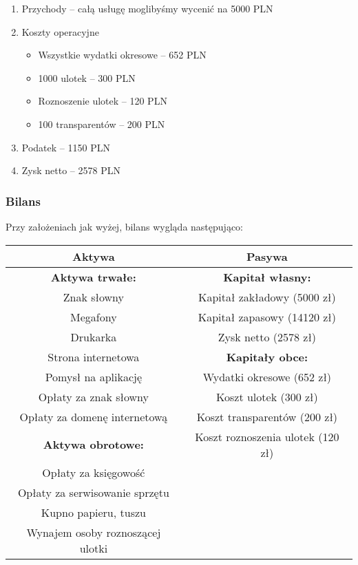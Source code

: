 \documentclass{article}
\begin{document}
\begin{enumerate}
\item Przychody -- całą usługę moglibyśmy wycenić na 5000 PLN
\item Koszty operacyjne
\begin{itemize}
\item Wszystkie wydatki okresowe -- 652 PLN
\item 1000 ulotek -- 300 PLN
\item Roznoszenie ulotek -- 120 PLN
\item 100 transparentów -- 200 PLN
\end{itemize}
\item Podatek -- 1150 PLN
\item Zysk netto -- 2578 PLN
\end{enumerate}

\subsubsection{Bilans}
Przy założeniach jak wyżej, bilans wygląda następująco:
\begin{table}[!ht]
\label{tableb}
\vspace{0.3cm}
\hspace{-2cm}
\centering
\begin{tabular}{|c|c|}
\hline
\textbf{Aktywa} & \textbf{Pasywa} \\
\hline
\textbf{Aktywa trwałe:} & \textbf{Kapitał własny:} \\
Znak słowny & Kapitał zakładowy (5000 zł) \\
Megafony & Kapitał zapasowy (14120 zł) \\
Drukarka	& Zysk netto (2578 zł) \\
Strona internetowa & \textbf{Kapitały obce:} \\
Pomysł na aplikację & Wydatki okresowe (652 zł) \\
Opłaty za znak słowny  & Koszt ulotek (300 zł) \\
Opłaty za domenę internetową & Koszt transparentów (200 zł) \\
\textbf{Aktywa obrotowe:} & Koszt roznoszenia ulotek (120 zł) \\
Opłaty za księgowość & \\
Opłaty za serwisowanie sprzętu & \\
Kupno papieru, tuszu & \\
Wynajem osoby roznoszącej ulotki & \\
\hline
\end{tabular}
\end{table}
\end{document}

